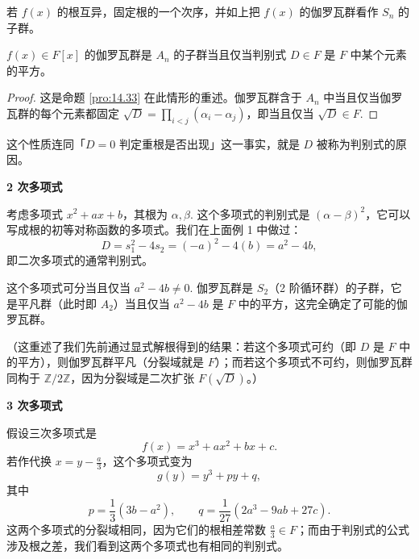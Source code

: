 若 \(f(x)\) 的根互异，固定根的一个次序，并如上把 \(f(x)\) 的伽罗瓦群看作 \(S_n\) 的子群。

\begin{proposition}\label{pro:14.34}
\(f(x) \in F[x]\) 的伽罗瓦群是 \(A_n\) 的子群当且仅当判别式 \(D \in F\) 是 \(F\) 中某个元素的平方。
\end{proposition}

\begin{proof}
这是命题 \ref{pro:14.33} 在此情形的重述。伽罗瓦群含于 \(A_n\) 中当且仅当伽罗瓦群的每个元素都固定 \(\sqrt{D} = \prod_{i<j}(\alpha_i-\alpha_j)\)，即当且仅当 \(\sqrt{D} \in F\).
\end{proof}

这个性质连同「\(D = 0\) 判定重根是否出现」这一事实，就是 \(D\) 被称为判别式的原因。

\noindent\textbf{2 次多项式}

考虑多项式 \(x^2+ax+b\)，其根为 \(\alpha, \beta\). 这个多项式的判别式是 \((\alpha-\beta)^2\)，它可以写成根的初等对称函数的多项式。我们在上面例 1 中做过：
\[
D = s_1^2-4s_2 = (-a)^2-4(b) = a^2-4b,
\]
即二次多项式的通常判别式。

这个多项式可分当且仅当 \(a^2-4b \neq 0\). 伽罗瓦群是 \(S_2\)（2 阶循环群）的子群，它是平凡群（此时即 \(A_2\)）当且仅当 \(a^2-4b\) 是 \(F\) 中的平方，这完全确定了可能的伽罗瓦群。

（这重述了我们先前通过显式解根得到的结果：若这个多项式可约（即 \(D\) 是 \(F\) 中的平方），则伽罗瓦群平凡（分裂域就是 \(F\)）；而若这个多项式不可约，则伽罗瓦群同构于 \(\mathbb{Z}/2\mathbb{Z}\)，因为分裂域是二次扩张 \(F(\sqrt{D})\)。）

\noindent\textbf{3 次多项式}

假设三次多项式是
\begin{equation}
f(x) = x^3+ax^2+bx+c. \tag{14.15}
\end{equation}
若作代换 \(x = y-\frac{a}{3}\)，这个多项式变为
\begin{equation}
g(y) = y^3+py+q, \tag{14.16}
\end{equation}
其中
\begin{equation}
p = \frac{1}{3}(3b-a^2), \qquad q = \frac{1}{27}(2a^3-9ab+27c). \tag{14.17}
\end{equation}
这两个多项式的分裂域相同，因为它们的根相差常数 \(\frac{a}{3} \in F\)；而由于判别式的公式涉及根之差，我们看到这两个多项式也有相同的判别式。

